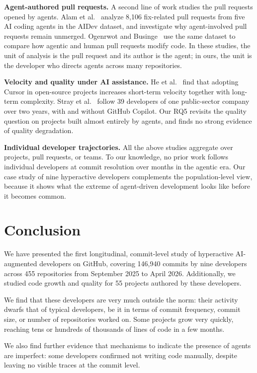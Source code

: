 \documentclass[smallextended]{svjour3}
\begin{document}
\textbf{Agent-authored pull requests.}
A second line of work studies the pull requests opened by agents.
Alam et al.~\cite{Alam2026} analyze 8,106 fix-related pull requests from five AI coding agents in the AIDev dataset, and investigate why agent-involved pull requests remain unmerged.
Ogenrwot and Businge~\cite{ogenrwot2026ai} use the same dataset to compare how agentic and human pull requests modify code.
In these studies, the unit of analysis is the pull request and its author is the agent; in ours, the unit is the developer who directs agents across many repositories.

\textbf{Velocity and quality under AI assistance.}
He et al.~\cite{he2025speed} find that adopting Cursor in open-source projects increases short-term velocity together with long-term complexity.
Stray et al.~\cite{stray2026copilot} follow 39 developers of one public-sector company over two years, with and without GitHub Copilot.
Our RQ5 revisits the quality question on projects built almost entirely by agents, and finds no strong evidence of quality degradation.

\textbf{Individual developer trajectories.}
All the above studies aggregate over projects, pull requests, or teams.
To our knowledge, no prior work follows individual developers at commit resolution over months in the agentic era.
Our case study of nine hyperactive developers complements the population-level view, because it shows what the extreme of agent-driven development looks like before it becomes common.

\section{Conclusion}
\label{sec:conclusion}

We have presented the first longitudinal, commit-level study of hyperactive AI-augmented developers on GitHub, covering 146,940 commits by nine developers across 455 repositories from September 2025 to April 2026. Additionally, we studied code growth and quality for 55 projects authored by these developers.

We find that these developers are very much outside the norm: their activity dwarfs that of typical developers, be it in terms of commit frequency, commit size, or number of repositories worked on. Some projects grow very quickly, reaching tens or hundreds of thousands of lines of code in a few months.

We also find further evidence that mechanisms to indicate the presence of agents are imperfect: some developers confirmed not writing code manually, despite leaving no visible traces at the commit level.
\end{document}
